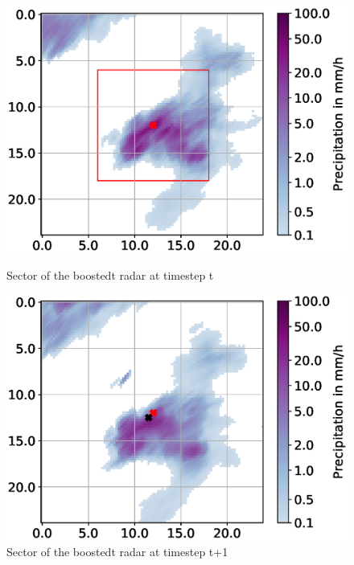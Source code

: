 \documentclass[11pt,twoside,a4paper,fleqn]{report}
\numberwithin{equation}{chapter}
\numberwithin{figure}{chapter}
\numberwithin{table}{chapter}
\begin{document}
\begin{figure}[h]
	\centering
	\begin{minipage}{0.48\textwidth}
		\includegraphics[width=\textwidth]{displacement_t0.eps}
		\caption{Sector of the boostedt radar at timestep t}
		\label{fig:displacement_t0}
	\end{minipage}\hfill
	\begin{minipage}{0.48\textwidth}
		\includegraphics[width=\textwidth]{displacement_t1.eps}
		\caption{Sector of the boostedt radar at timestep t+1}
		\label{fig:displacement_t1}
	\end{minipage}

\end{figure}
\end{document}

